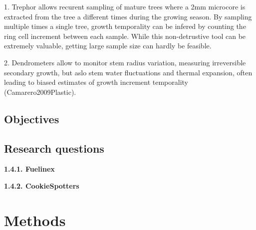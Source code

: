 \documentclass{article}
\begin{document}
1. Trephor allows recurent sampling of mature trees where a 2mm microcore is extracted from the tree a different times during the growing season. By sampling multiple times a single tree, growth temporality can be infered by counting the ring cell increment between each sample. While this non-detrustive tool can be extremely valuable, getting large sample size can hardly be feasible. 

2. Dendrometers allow to monitor stem radius variation, measuring irreversible secondary growth, but aslo stem water fluctuations and thermal expansion, often leading to biased estimates of growth increment temporality (Camarero2009Plastic).



\subsection{Objectives} 

\subsection {Research questions} 

\textbf{1.4.1. Fuelinex}

\textbf{1.4.2. CookieSpotters}


\section{Methods}

\end{document}
